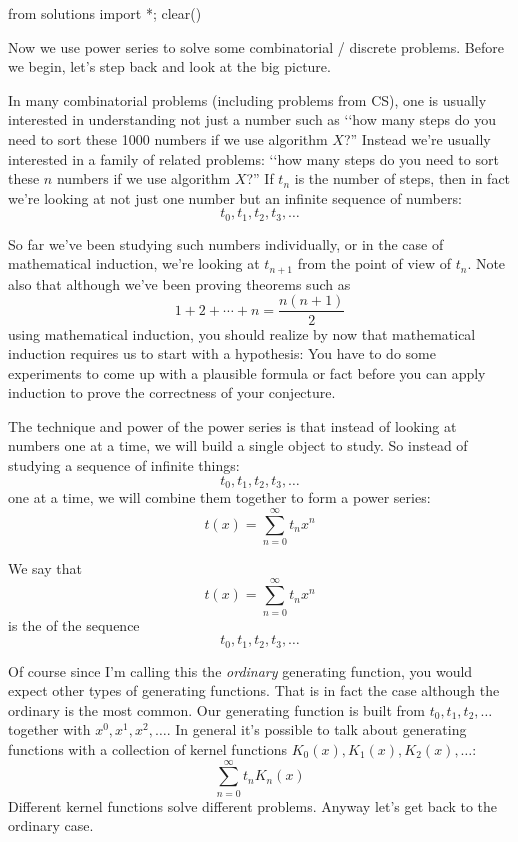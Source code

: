 \begin{python0}
from solutions import *; clear() 
\end{python0}

Now we use power series to solve some combinatorial / discrete problems.
Before we begin, let's step back and look at the big picture.

In many combinatorial problems (including problems from CS), one is usually
interested in understanding not just a number such as
\lq\lq how many steps do you need to sort these 1000 numbers if we use 
algorithm $X$?''
Instead we're usually interested in a family of related problems:
\lq\lq how many steps do you need to sort these $n$ numbers if we use 
algorithm $X$?''
If $t_n$ is the number of steps, then in fact we're looking at not just
one number but an infinite sequence of numbers:
\[
t_0, t_1, t_2, t_3, \ldots
\]

So far we've been studying such numbers individually, or
in the case of mathematical induction, we're looking at $t_{n+1}$
from the point of view of $t_n$.
Note also that although we've been proving theorems such as
\[
1 + 2 + \cdots + n = \frac{n(n+1)}{2}
\]
using mathematical induction, you should realize by now that
mathematical induction requires us to start with a 
hypothesis:
You have to do some experiments to come up with a plausible
formula or fact before you can apply induction to prove
the correctness of your conjecture.

The technique and power of the power series is that instead of
looking at numbers one at a time, we will build a single object to study.
So instead of studying a sequence of infinite things:
\[
t_0, t_1, t_2, t_3, \ldots
\]
one at a time, we will combine them together to form a power series:
\[
t(x) = \sum_{n=0}^\infty t_n x^n
\]

We say that 
\[
t(x) = \sum_{n=0}^\infty t_n x^n
\]
is the  of the sequence
\[
t_0, t_1, t_2, t_3, \ldots
\]

Of course since I'm calling this the \textit{ordinary} generating
function, you would expect other types of generating functions.
That is in fact the case although the ordinary is the most common.
Our generating function is built from $t_0, t_1, t_2, \ldots$
together with $x^0, x^1, x^2, \ldots$.
In general it's possible to talk about generating functions 
with a collection of kernel functions $K_0(x), K_1(x), K_2(x), \ldots$:
\[
\sum_{n=0}^\infty t_n K_n(x)
\]
Different kernel functions solve different problems.
Anyway let's get back to the ordinary case.

